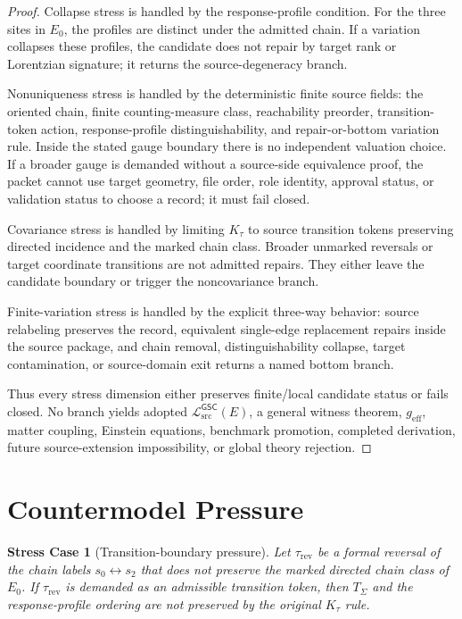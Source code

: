 \documentclass[11pt]{article}
\newcommand{\MetricData}{\mathcal{L}_{\mathrm{src}}^{\mathsf{GSC}}}
\newcommand{\geff}{g_{\mathrm{eff}}}
\newcommand{\Ezero}{E_{0}}
\newtheorem{stresscase}{Stress Case}
\begin{document}
\begin{proof}
Collapse stress is handled by the response-profile condition. For the three
sites in \(\Ezero\), the profiles are distinct under the admitted chain. If a
variation collapses these profiles, the candidate does not repair by target
rank or Lorentzian signature; it returns the source-degeneracy branch.

Nonuniqueness stress is handled by the deterministic finite source fields:
the oriented chain, finite counting-measure class, reachability preorder,
transition-token action, response-profile distinguishability, and
repair-or-bottom variation rule. Inside the stated gauge boundary there is no
independent valuation choice. If a broader gauge is demanded without a
source-side equivalence proof, the packet cannot use target geometry, file
order, role identity, approval status, or validation status to choose a
record; it must fail closed.

Covariance stress is handled by limiting \(K_{\tau}\) to source transition
tokens preserving directed incidence and the marked chain class. Broader
unmarked reversals or target coordinate transitions are not admitted repairs.
They either leave the candidate boundary or trigger the noncovariance branch.

Finite-variation stress is handled by the explicit three-way behavior:
source relabeling preserves the record, equivalent single-edge replacement
repairs inside the source package, and chain removal, distinguishability
collapse, target contamination, or source-domain exit returns a named bottom
branch.

Thus every stress dimension either preserves finite/local candidate status or
fails closed. No branch yields adopted \(\MetricData(E)\), a general witness
theorem, \(\geff\), matter coupling, Einstein equations, benchmark promotion,
completed derivation, future source-extension impossibility, or global theory
rejection.
\end{proof}

\section{Countermodel Pressure}

\begin{stresscase}[Transition-boundary pressure]
Let \(\tau_{\mathrm{rev}}\) be a formal reversal of the chain labels
\(s_0\leftrightarrow s_2\) that does not preserve the marked directed chain
class of \(\Ezero\). If \(\tau_{\mathrm{rev}}\) is demanded as an admissible
transition token, then \(T_{\Sigma}\) and the response-profile ordering are
not preserved by the original \(K_{\tau}\) rule.
\end{stresscase}
\end{document}
